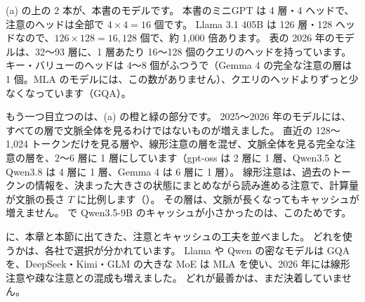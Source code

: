 (a) の上の 2 本が、本書のモデルです。
本書のミニGPT は 4 層・4 ヘッドで、注意のヘッドは全部で $4\times4=16$ 個です。
Llama 3.1 405B は 126 層・128 ヘッドなので、$126\times128=16{,}128$ 個で、約 1,000 倍あります。
表の 2026 年のモデルは、32〜93 層に、1 層あたり 16〜128 個のクエリのヘッドを持っています。
キー・バリューのヘッドは 4〜8 個がふつうで（Gemma 4 の完全な注意の層は 1 個。MLA のモデルには、この数がありません）、クエリのヘッドよりずっと少なくなっています（GQA）。

もう一つ目立つのは、(a) の橙と緑の部分です。
2025〜2026 年のモデルには、すべての層で文脈全体を見るわけではないものが増えました。
直近の 128〜1,024 トークンだけを見る層や、線形注意の層を混ぜ、文脈全体を見る完全な注意の層を、2〜6 層に 1 層にしています（gpt-oss は 2 層に 1 層、Qwen3.5 と Qwen3.8 は 4 層に 1 層、Gemma 4 は 6 層に 1 層）。
線形注意は、過去のトークンの情報を、決まった大きさの状態にまとめながら読み進める注意で、計算量が文脈の長さ $T$ に比例します（）。
その層は、文脈が長くなってもキャッシュが増えません。
で Qwen3.5-9B のキャッシュが小さかったのは、このためです。

に、本章と本節に出てきた、注意とキャッシュの工夫を並べました。
どれを使うかは、各社で選択が分かれています。
Llama や Qwen の密なモデルは GQA を、DeepSeek・Kimi・GLM の大きな MoE は MLA を使い、2026 年には線形注意や疎な注意との混成も増えました。
どれが最善かは、まだ決着していません。

